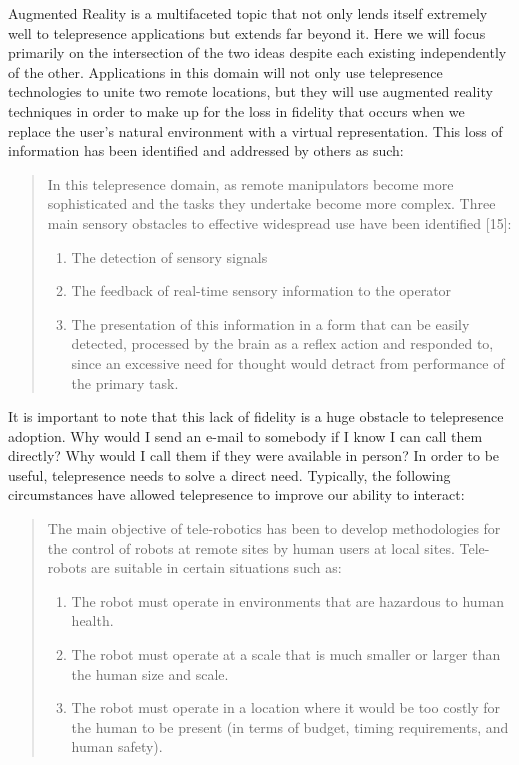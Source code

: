 \documentclass[a4paper,12pt]{report}
\begin{document}
Augmented Reality is a multifaceted topic that not only lends itself extremely well to telepresence applications but extends far beyond it. Here we will focus primarily on the intersection of the two ideas despite each existing independently of the other. Applications in this domain will not only use telepresence technologies to unite two remote locations, but they will use augmented reality techniques in order to make up for the loss in fidelity that occurs when we replace the user's natural environment with a virtual representation. This loss of information has been identified and addressed by others as such:
\begin{quote}

In this telepresence domain, as remote manipulators become more sophisticated and the tasks they undertake become more complex. Three main sensory obstacles to effective widespread use have been identified [15]:
	\begin{enumerate}
		\item The detection of sensory signals
		\item The feedback of real-time sensory information to the operator
		\item The presentation of this information in a form that can be easily detected, processed by the brain as a reflex action and responded to, since an excessive need for thought would detract from performance of the primary task.
	\end{enumerate}
	\begin{flushright}
		\cite{540147}
	\end{flushright}
\end{quote}

It is important to note that this lack of fidelity is a huge obstacle to telepresence adoption. Why would I send an e-mail to somebody if I know I can call them directly? Why would I call them if they were available in person? In order to be useful, telepresence needs to solve a direct need. Typically, the following circumstances have allowed telepresence to improve our ability to interact:

\begin{quote}

The main objective of tele-robotics has been to develop methodologies for the control of robots at remote sites by human users at local sites. Tele-robots are suitable in certain situations such as:
\begin{enumerate}
\item The robot must operate in environments that are hazardous to human health.
\item The robot must operate at a scale that is much smaller or larger than the human size and scale.
\item The robot must operate in a location where it would be too costly for the human to be present (in terms of budget, timing requirements, and human safety).
\end{enumerate}
	\begin{flushright}
		\cite{726589}
	\end{flushright}
\end{quote}
\end{document}

